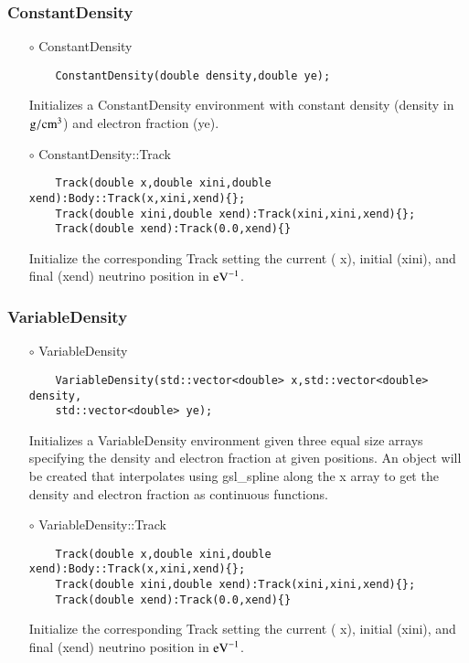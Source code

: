 \subsubsection{ConstantDensity}

\begin{itemize}
\item[$\circ$] {\ttf ConstantDensity}
  \begin{lstlisting}
    ConstantDensity(double density,double ye);
  \end{lstlisting}
  Initializes a {\ttf ConstantDensity} environment with constant
  density ({\ttf density} in ${\rm g}/{\rm cm}^3$) and electron
  fraction ({\ttf ye}).
\item[$\circ$] {\ttf ConstantDensity::Track}
  \begin{lstlisting}
    Track(double x,double xini,double xend):Body::Track(x,xini,xend){};
    Track(double xini,double xend):Track(xini,xini,xend){};
    Track(double xend):Track(0.0,xend){}
  \end{lstlisting}
  Initialize the corresponding {\ttf Track} setting the current ({\ttf
  x}), initial ({\ttf xini}), and final ({\ttf xend}) neutrino position in ${\rm eV}^{-1}$.
\end{itemize}

\subsubsection{VariableDensity}

\begin{itemize}
\item[$\circ$] {\ttf VariableDensity}
  \begin{lstlisting}
    VariableDensity(std::vector<double> x,std::vector<double> density,
    std::vector<double> ye);
  \end{lstlisting}
  Initializes a {\ttf VariableDensity} environment given three equal size arrays specifying the density and electron fraction at given positions. An object will be created that interpolates using {\ttfamily gsl\_spline} \citep{gough2009gnu} along the {\ttf x} array to get the density and electron fraction as continuous functions.
  \item[$\circ$] {\ttf VariableDensity::Track}
  \begin{lstlisting}
    Track(double x,double xini,double xend):Body::Track(x,xini,xend){};
    Track(double xini,double xend):Track(xini,xini,xend){};
    Track(double xend):Track(0.0,xend){}
  \end{lstlisting}
  Initialize the corresponding {\ttf Track} setting the current ({\ttf
  x}), initial ({\ttf xini}), and final ({\ttf xend}) neutrino position in ${\rm eV}^{-1}$.
\end{itemize}

